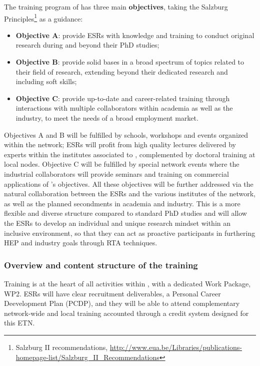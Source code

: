 The training program of \acronym has three main {\bf objectives}, taking the Salzburg Principles\footnote{Salzburg II recommendations, \url{http://www.eua.be/Libraries/publications-homepage-list/Salzburg_II_Recommendations}} as a guidance: 
\begin{itemize}
\item {\bf Objective A}: provide ESRs with knowledge and training to conduct original research during and beyond their PhD studies;
\item {\bf Objective B}: provide solid bases in a broad spectrum of topics related to their field of research, extending beyond their dedicated research and including soft skills; 
\item {\bf Objective C}: provide up-to-date and career-related training through interactions with multiple collaborators within academia as well as the industry, to meet the needs of a broad employment market.
\end{itemize}

Objectives A and B will be fulfilled by schools, workshops and events organized within the network; ESRs will profit from high quality lectures delivered by experts within the institutes associated to \acronym, complemented by doctoral training at local nodes. Objective C will be fulfilled by special network events where the industrial collaborators will provide seminars and training on commercial applications of \acronym's objectives. All these objectives will be further addressed via the natural collaboration between the ESRs and the various institutes of the network, as well as the planned secondments in academia and industry. This is a more flexible and diverse structure compared to standard PhD studies and will allow the ESRs to develop an individual and unique research mindset within an inclusive environment, so that they can act as proactive participants in furthering HEP and industry goals through RTA techniques.

\vspace{-2mm}
\subsubsection{Overview and content structure of the training}
\label{sub:overviewTraining}

Training is at the heart of all activities within \acronym, with a dedicated Work Package, WP2. ESRs will have clear recruitment deliverables, a Personal Career Deevelopment Plan (PCDP), and they will be able to attend complementary network-wide and local training accounted through a credit system designed for this ETN. 


